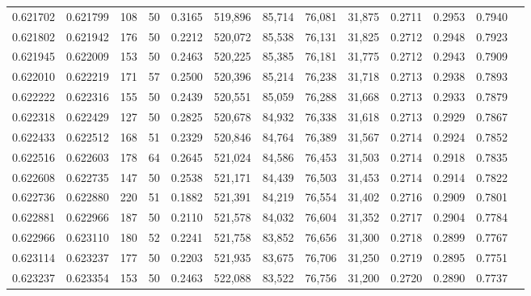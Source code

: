 \begin{tabular}{rrrrrrrrrrrrr}
0.621702 & 0.621799 &   108 &  50 &                                     0.3165 & 519,896 &  85,714 &  76,081 &  31,875 & 0.2711 & 0.2953 & 0.7940 \\
0.621802 & 0.621942 &   176 &  50 &                                     0.2212 & 520,072 &  85,538 &  76,131 &  31,825 & 0.2712 & 0.2948 & 0.7923 \\
0.621945 & 0.622009 &   153 &  50 &                                     0.2463 & 520,225 &  85,385 &  76,181 &  31,775 & 0.2712 & 0.2943 & 0.7909 \\
0.622010 & 0.622219 &   171 &  57 &                                     0.2500 & 520,396 &  85,214 &  76,238 &  31,718 & 0.2713 & 0.2938 & 0.7893 \\
0.622222 & 0.622316 &   155 &  50 &                                     0.2439 & 520,551 &  85,059 &  76,288 &  31,668 & 0.2713 & 0.2933 & 0.7879 \\
0.622318 & 0.622429 &   127 &  50 &                                     0.2825 & 520,678 &  84,932 &  76,338 &  31,618 & 0.2713 & 0.2929 & 0.7867 \\
0.622433 & 0.622512 &   168 &  51 &                                     0.2329 & 520,846 &  84,764 &  76,389 &  31,567 & 0.2714 & 0.2924 & 0.7852 \\
0.622516 & 0.622603 &   178 &  64 &                                     0.2645 & 521,024 &  84,586 &  76,453 &  31,503 & 0.2714 & 0.2918 & 0.7835 \\
0.622608 & 0.622735 &   147 &  50 &                                     0.2538 & 521,171 &  84,439 &  76,503 &  31,453 & 0.2714 & 0.2914 & 0.7822 \\
0.622736 & 0.622880 &   220 &  51 &                                     0.1882 & 521,391 &  84,219 &  76,554 &  31,402 & 0.2716 & 0.2909 & 0.7801 \\
0.622881 & 0.622966 &   187 &  50 &                                     0.2110 & 521,578 &  84,032 &  76,604 &  31,352 & 0.2717 & 0.2904 & 0.7784 \\
0.622966 & 0.623110 &   180 &  52 &                                     0.2241 & 521,758 &  83,852 &  76,656 &  31,300 & 0.2718 & 0.2899 & 0.7767 \\
0.623114 & 0.623237 &   177 &  50 &                                     0.2203 & 521,935 &  83,675 &  76,706 &  31,250 & 0.2719 & 0.2895 & 0.7751 \\
0.623237 & 0.623354 &   153 &  50 &                                     0.2463 & 522,088 &  83,522 &  76,756 &  31,200 & 0.2720 & 0.2890 & 0.7737 \\

\end{tabular}
